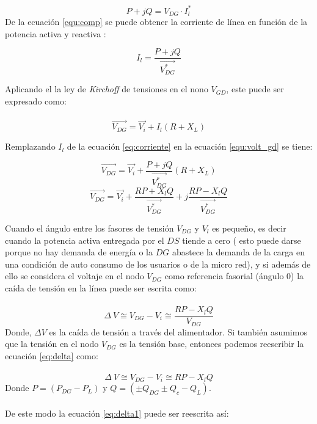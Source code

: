 \documentclass[12pt, letterpaper]{report}
\begin{document}
\begin{equation}
\label{equ:comp}
P + jQ = V_{DG} \cdot I_{l}^{*}
\end{equation}
De la ecuación \ref{equ:comp}  se puede obtener  la corriente de línea en función de la potencia activa y reactiva :

\begin{equation}
I_{l}= \dfrac{P + jQ}{\overrightarrow{V_{DG}^{*}}}
\label{eq:corriente}
\end{equation}

Aplicando el la ley de \textit{ Kirchoff } de tensiones en el nono  $V_{GD}$, este  puede ser expresado como:\\\\
\begin{equation}
\label{equ:volt_gd}
\overrightarrow{V_{DG}}= \overrightarrow{V_{i}} + I_{l}(R + X_{L})
\end{equation}

Remplazando $ I_{l} $ de  la ecuación \ref{eq:corriente} en la ecuación  \ref{equ:volt_gd} se tiene:

\[\overrightarrow{V_{DG}}= \overrightarrow{V_{i}} + \dfrac{P + jQ}{\overrightarrow{V_{DG}^{*}}}(R + X_{L})\]
\begin{equation}
\overrightarrow{V_{DG}}= \overrightarrow{V_{i}} + \dfrac{RP + X_{l}Q}{\overrightarrow{V_{DG}^{*}}} + j\dfrac{RP - X_{l}Q }{\overrightarrow{V_{DG}^{*}}}
\end{equation}

Cuando el ángulo entre los fasores de tensión  $V_{DG}$  y $V_{l}$ es pequeño, es decir cuando la potencia activa entregada por el $DS$ tiende a cero \cite{Akagi1932} (  esto puede darse porque no hay demanda de energía o la $DG$ abastece la demanda de la carga en una condición de auto consumo de los usuarios o de la micro red), y si además de ello se considera el voltaje en el nodo $V_{DG}$ como referencia fasorial (ángulo 0) la caída de tensión en la línea puede ser escrita como:\\\\
\begin{equation}
\Delta\ V \cong V_{DG} - V_{i}\cong \dfrac{RP - X_{l}Q }{V_{DG}}
\label{eq:delta} 
\end{equation}
Donde, $\Delta V$ es la caída de tensión a través del alimentador. Si también asumimos que la tensión en el nodo  $V_{DG}$  es la tensión base, entonces podemos reescribir la ecuación \ref{eq:delta} como:\\\\
\begin{equation}
\Delta\ V \cong V_{DG} - V_{i}\cong RP - X_{l}Q 
\label{eq:delta1} 
\end{equation}
Donde $P=(P_{DG}-P_{L})$  y  $ Q = (\pm Q_{DG} \pm Q_{c} - Q_{L})$.\\\\
De este modo la ecuación \ref{eq:delta1} puede ser reescrita así:
\end{document}
